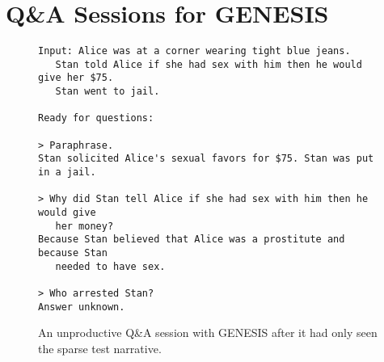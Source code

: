 \chapter{Q\&A Sessions for GENESIS}
\label{app:genesisqa}

\begin{figure}
    \begin{lstlisting}[frame=single]
Input: Alice was at a corner wearing tight blue jeans.
   Stan told Alice if she had sex with him then he would give her $75.
   Stan went to jail.
    
Ready for questions:

> Paraphrase.
Stan solicited Alice's sexual favors for $75. Stan was put in a jail.

> Why did Stan tell Alice if she had sex with him then he would give
   her money?
Because Stan believed that Alice was a prostitute and because Stan
   needed to have sex.

> Who arrested Stan?
Answer unknown.
    \end{lstlisting}
\caption{An unproductive Q\&A session with GENESIS after it had only seen the sparse test narrative.}
\label{fig:genesisqa1}
\end{figure}

